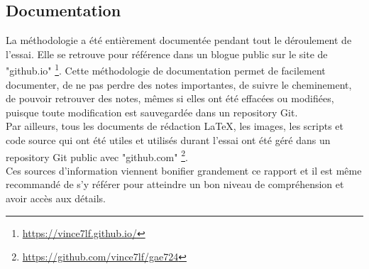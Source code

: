 \subsection{Documentation}
\noindent La méthodologie a été entièrement documentée pendant tout le déroulement de l'essai. Elle se retrouve pour référence dans un blogue public sur le site de "github.io" \footnote{\url{https://vince7lf.github.io/}}. Cette méthodologie de documentation permet de facilement documenter, de ne pas perdre des notes importantes, de suivre le cheminement, de pouvoir retrouver des notes, mêmes si elles ont été effacées ou modifiées, puisque toute modification est sauvegardée dans un repository Git.
\vspace{0.5\baselineskip}
\\
\noindent Par ailleurs, tous les documents de rédaction LaTeX, les images, les scripts et code source qui ont été utiles et utilisés durant l'essai ont été géré dans un repository Git public avec "github.com" \footnote{\url{https://github.com/vince7lf/gae724}}. 
\vspace{0.5\baselineskip}
\\
\noindent Ces sources d'information viennent bonifier grandement ce rapport et il est même recommandé de s'y référer pour atteindre un bon niveau de compréhension et avoir accès aux détails. 
% 
% 
% 
% 
% 
% 
